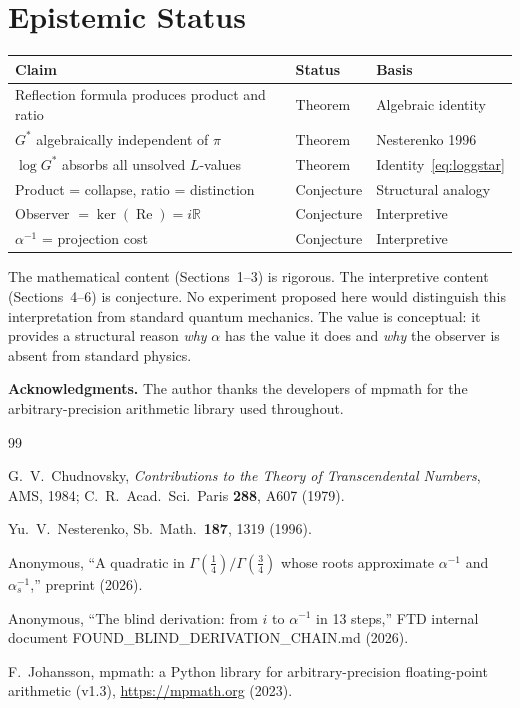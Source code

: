 \documentclass[12pt,reqno]{amsart}
\theoremstyle{definition}
\theoremstyle{remark}
\newcommand{\RR}{\mathbb{R}}
\newcommand{\Gstar}{G^{\!*}}
\newcommand{\re}{\operatorname{Re}}
\begin{document}
\section{Epistemic Status}

\begin{center}
\begin{tabular}{@{}lll@{}}
\toprule
Claim & Status & Basis \\
\midrule
Reflection formula produces product and ratio & Theorem & Algebraic identity \\
$\Gstar$ algebraically independent of $\pi$ & Theorem & Nesterenko 1996 \\
$\log\Gstar$ absorbs all unsolved $L$-values & Theorem & Identity~\eqref{eq:loggstar} \\
Product = collapse, ratio = distinction & Conjecture & Structural analogy \\
Observer $=\ker(\re)=i\RR$ & Conjecture & Interpretive \\
$\alpha^{-1}$ = projection cost & Conjecture & Interpretive \\
\bottomrule
\end{tabular}
\end{center}

\smallskip
The mathematical content (Sections~1--3) is rigorous. The interpretive content
(Sections~4--6) is conjecture. No experiment proposed here would distinguish this
interpretation from standard quantum mechanics. The value is conceptual: it provides
a structural reason \emph{why} $\alpha$ has the value it does and \emph{why} the
observer is absent from standard physics.

\bigskip
\noindent\textbf{Acknowledgments.}
The author thanks the developers of mpmath \cite{mpmath} for the arbitrary-precision
arithmetic library used throughout.

\begin{thebibliography}{99}

G.~V.~Chudnovsky,
\emph{Contributions to the Theory of Transcendental Numbers},
AMS, 1984;
C.~R.~Acad.~Sci.~Paris \textbf{288}, A607 (1979).

Yu.~V.~Nesterenko,
Sb.~Math.\ \textbf{187}, 1319 (1996).

Anonymous,
``A quadratic in $\Gamma(\tfrac14)/\Gamma(\tfrac34)$ whose roots approximate
$\alpha^{-1}$ and $\alpha_s^{-1}$,''
preprint (2026).

Anonymous,
``The blind derivation: from $i$ to $\alpha^{-1}$ in 13 steps,''
FTD internal document FOUND\_BLIND\_DERIVATION\_CHAIN.md (2026).

F.~Johansson,
mpmath: a Python library for arbitrary-precision floating-point arithmetic (v1.3),
\url{https://mpmath.org} (2023).

\end{thebibliography}
\end{document}
